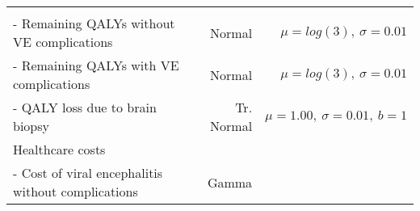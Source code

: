 \documentclass[
]{article}
\begin{document}
\begin{longtable}[]{@{}lrr@{}}
\begin{minipage}[t]{0.39\columnwidth}
\strut
\end{minipage}\tabularnewline
\begin{minipage}[t]{0.34\columnwidth}\raggedright
- Remaining QALYs without VE complications\strut
\end{minipage} & \begin{minipage}[t]{0.18\columnwidth}\raggedleft
Normal\strut
\end{minipage} & \begin{minipage}[t]{0.39\columnwidth}\raggedleft
\(\mu = log(3), \ \sigma = 0.01\)\strut
\end{minipage}\tabularnewline
\begin{minipage}[t]{0.34\columnwidth}\raggedright
- Remaining QALYs with VE complications\strut
\end{minipage} & \begin{minipage}[t]{0.18\columnwidth}\raggedleft
Normal\strut
\end{minipage} & \begin{minipage}[t]{0.39\columnwidth}\raggedleft
\(\mu = log(3), \ \sigma = 0.01\)\strut
\end{minipage}\tabularnewline
\begin{minipage}[t]{0.34\columnwidth}\raggedright
- QALY loss due to brain biopsy\strut
\end{minipage} & \begin{minipage}[t]{0.18\columnwidth}\raggedleft
Tr. Normal\strut
\end{minipage} & \begin{minipage}[t]{0.39\columnwidth}\raggedleft
\(\mu = 1.00, \ \sigma = 0.01, \ b = 1\)\strut
\end{minipage}\tabularnewline
\begin{minipage}[t]{0.34\columnwidth}\raggedright
Healthcare costs\strut
\end{minipage} & \begin{minipage}[t]{0.18\columnwidth}\raggedleft
\strut
\end{minipage} & \begin{minipage}[t]{0.39\columnwidth}\raggedleft
\strut
\end{minipage}\tabularnewline
\begin{minipage}[t]{0.34\columnwidth}\raggedright
- Cost of viral encephalitis without complications\strut
\end{minipage} & \begin{minipage}[t]{0.18\columnwidth}\raggedleft
Gamma\strut
\end{minipage} & \begin{minipage}[t]{0.39\columnwidth}\raggedleft

\end{minipage}
\end{longtable}
\end{document}
